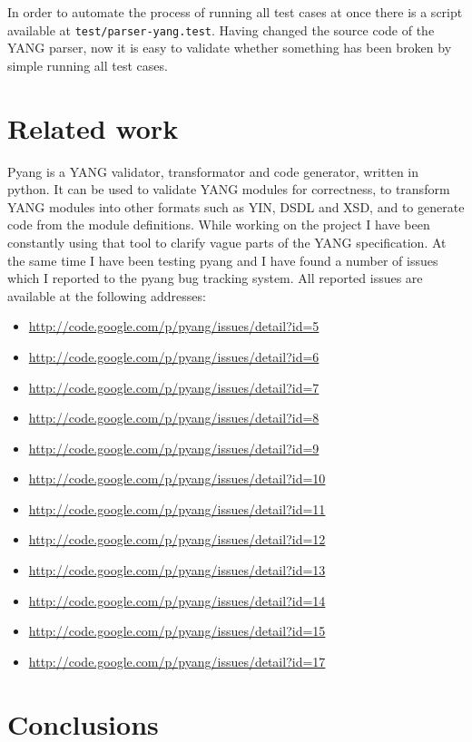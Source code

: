 \documentclass[conference]{IEEEtran}
\begin{document}
In order to automate the process of running all test cases at once there is a script available at \texttt{test/parser-yang.test}. Having changed the source code of the YANG parser, now it is easy to validate whether something has been broken by simple running all test cases.

\section{Related work}
Pyang \cite{bib8} is a YANG validator, transformator and code generator, written in python. It can be used to validate YANG modules for correctness, to transform YANG modules into other formats such as YIN, DSDL and XSD, and to generate code from the module definitions. While working on the project I have been constantly using that tool to clarify vague parts of the YANG specification. At the same time I have been testing pyang and I have found a number of issues which I reported to the pyang bug tracking system. All reported issues are available at the following addresses:
\begin{itemize}
\item \url{http://code.google.com/p/pyang/issues/detail?id=5}
\item \url{http://code.google.com/p/pyang/issues/detail?id=6}
\item \url{http://code.google.com/p/pyang/issues/detail?id=7}
\item \url{http://code.google.com/p/pyang/issues/detail?id=8}
\item \url{http://code.google.com/p/pyang/issues/detail?id=9}
\item \url{http://code.google.com/p/pyang/issues/detail?id=10}
\item \url{http://code.google.com/p/pyang/issues/detail?id=11}
\item \url{http://code.google.com/p/pyang/issues/detail?id=12}
\item \url{http://code.google.com/p/pyang/issues/detail?id=13}
\item \url{http://code.google.com/p/pyang/issues/detail?id=14}
\item \url{http://code.google.com/p/pyang/issues/detail?id=15}
\item \url{http://code.google.com/p/pyang/issues/detail?id=17}
\end{itemize}

\section{Conclusions}
\end{document}
